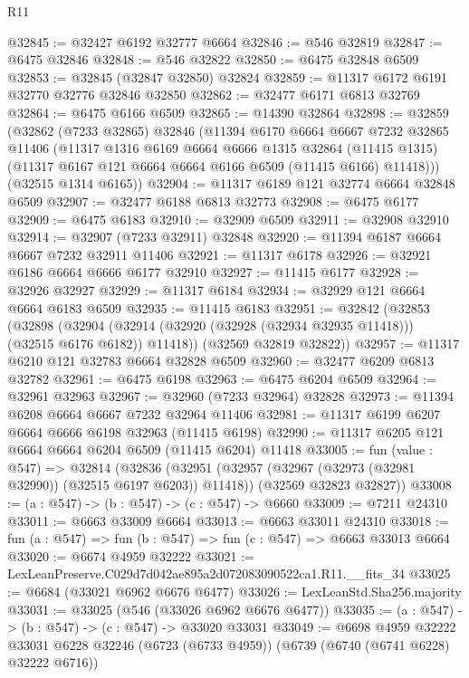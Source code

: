 \begin{lexlean}{R11}
\begin{coremodule}
@32845 := @32427 @6192 @32777 @6664
@32846 := @546 @32819
@32847 := @6475 @32846
@32848 := @546 @32822
@32850 := @6475 @32848 @6509
@32853 := @32845 (@32847 @32850) @32824
@32859 := @11317 @6172 @6191 @32770 @32776 @32846 @32850
@32862 := @32477 @6171 @6813 @32769
@32864 := @6475 @6166 @6509
@32865 := @14390 @32864
@32898 := @32859
    (@32862
      (@7233 @32865)
      @32846
      (@11394
        @6170
        @6664
        @6667
        @7232
        @32865
        @11406
        (@11317
          @1316
          @6169
          @6664
          @6666
          @1315
          @32864
          (@11415 @1315)
          (@11317 @6167 @121 @6664 @6664 @6166 @6509 (@11415 @6166) @11418)))
      (@32515 @1314 @6165))
@32904 := @11317 @6189 @121 @32774 @6664 @32848 @6509
@32907 := @32477 @6188 @6813 @32773
@32908 := @6475 @6177
@32909 := @6475 @6183
@32910 := @32909 @6509
@32911 := @32908 @32910
@32914 := @32907 (@7233 @32911) @32848
@32920 := @11394 @6187 @6664 @6667 @7232 @32911 @11406
@32921 := @11317 @6178
@32926 := @32921 @6186 @6664 @6666 @6177 @32910
@32927 := @11415 @6177
@32928 := @32926 @32927
@32929 := @11317 @6184
@32934 := @32929 @121 @6664 @6664 @6183 @6509
@32935 := @11415 @6183
@32951 := @32842
    (@32853
      (@32898
        (@32904 (@32914 (@32920 (@32928 (@32934 @32935 @11418))) (@32515 @6176 @6182)) @11418))
      (@32569 @32819 @32822))
@32957 := @11317 @6210 @121 @32783 @6664 @32828 @6509
@32960 := @32477 @6209 @6813 @32782
@32961 := @6475 @6198
@32963 := @6475 @6204 @6509
@32964 := @32961 @32963
@32967 := @32960 (@7233 @32964) @32828
@32973 := @11394 @6208 @6664 @6667 @7232 @32964 @11406
@32981 := @11317 @6199 @6207 @6664 @6666 @6198 @32963 (@11415 @6198)
@32990 := @11317 @6205 @121 @6664 @6664 @6204 @6509 (@11415 @6204) @11418
@33005 := fun (value : @547) =>
  @32814
    (@32836
      (@32951 (@32957 (@32967 (@32973 (@32981 @32990)) (@32515 @6197 @6203)) @11418))
      (@32569 @32823 @32827))
@33008 := (a : @547) -> (b : @547) -> (c : @547) -> @6660
@33009 := @7211 @24310
@33011 := @6663 @33009 @6664
@33013 := @6663 @33011 @24310
@33018 := fun (a : @547) => fun (b : @547) => fun (c : @547) => @6663 @33013 @6664
@33020 := @6674 @4959 @32222
@33021 := LexLeanPreserve.C029d7d042ae895a2d072083090522ca1.R11.__fits_34
@33025 := @6684 (@33021 @6962 @6676 @6477)
@33026 := LexLeanStd.Sha256.majority
@33031 := @33025 (@546 (@33026 @6962 @6676 @6477))
@33035 := (a : @547) -> (b : @547) -> (c : @547) -> @33020 @33031
@33049 := @6698
    @4959
    @32222
    @33031
    @6228
    @32246
    (@6723 (@6733 @4959))
    (@6739 (@6740 (@6741 @6228) @32222 @6716))

\end{coremodule}
\end{lexlean}
